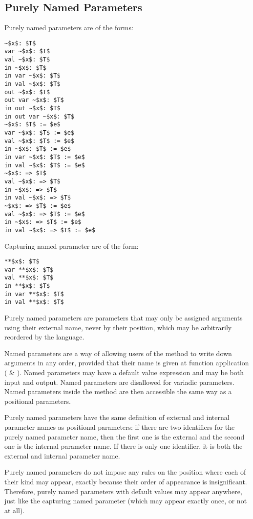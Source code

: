 \subsection{Purely Named Parameters}
\label{sec:named-parameters}
\label{sec:capturing-named-parameter}

Purely named parameters are of the forms:
\begin{lstlisting}
~$x$: $T$
var ~$x$: $T$
val ~$x$: $T$
in ~$x$: $T$
in var ~$x$: $T$
in val ~$x$: $T$
out ~$x$: $T$
out var ~$x$: $T$
in out ~$x$: $T$
in out var ~$x$: $T$
~$x$: $T$ := $e$
var ~$x$: $T$ := $e$
val ~$x$: $T$ := $e$
in ~$x$: $T$ := $e$
in var ~$x$: $T$ := $e$
in val ~$x$: $T$ := $e$
~$x$: => $T$
val ~$x$: => $T$
in ~$x$: => $T$
in val ~$x$: => $T$
~$x$: => $T$ := $e$
val ~$x$: => $T$ := $e$
in ~$x$: => $T$ := $e$
in val ~$x$: => $T$ := $e$
\end{lstlisting}

Capturing named parameter are of the form: 
\begin{lstlisting}
**$x$: $T$
var **$x$: $T$
val **$x$: $T$
in **$x$: $T$
in var **$x$: $T$
in val **$x$: $T$
\end{lstlisting}

Purely named parameters are parameters that may only be assigned arguments using their external name, never by their position, which may be arbitrarily reordered by the language. 

Named parameters are a way of allowing users of the method to write down arguments in any order, provided that their name is given at function application ( \& ). Named parameters may have a default value expression and may be both input and output. Named parameters are disallowed for variadic parameters. Named parameters inside the method are then accessible the same way as a positional parameters. 

Purely named parameters have the same definition of external and internal parameter names as positional parameters: if there are two identifiers for the purely named parameter name, then the first one is the external and the second one is the internal parameter name. If there is only one identifier, it is both the external and internal parameter name. 

Purely named parameters do not impose any rules on the position where each of their kind may appear, exactly because their order of appearance is insignificant. Therefore, purely named parameters with default values may appear anywhere, just like the capturing named parameter (which may appear exactly once, or not at all). 

